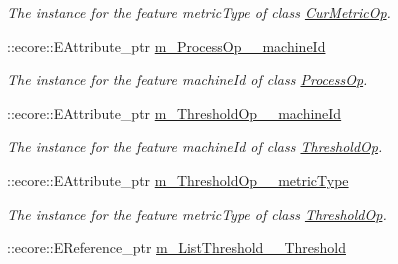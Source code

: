 \begin{DoxyCompactItemize}
\begin{DoxyCompactList}\small\item\em The instance for the feature metricType of class \hyperlink{classIMS__Data_1_1CurMetricOp}{CurMetricOp}. \item\end{DoxyCompactList}\item 
\hypertarget{classIMS__Data_1_1IMS__DataPackage_a6c70aefbee826b20356847d786c2ff93}{
::ecore::EAttribute\_\-ptr \hyperlink{classIMS__Data_1_1IMS__DataPackage_a6c70aefbee826b20356847d786c2ff93}{m\_\-ProcessOp\_\-\_\-machineId}}
\label{classIMS__Data_1_1IMS__DataPackage_a6c70aefbee826b20356847d786c2ff93}

\begin{DoxyCompactList}\small\item\em The instance for the feature machineId of class \hyperlink{classIMS__Data_1_1ProcessOp}{ProcessOp}. \item\end{DoxyCompactList}\item 
\hypertarget{classIMS__Data_1_1IMS__DataPackage_a8b64937de6982536668b46ae59641b3f}{
::ecore::EAttribute\_\-ptr \hyperlink{classIMS__Data_1_1IMS__DataPackage_a8b64937de6982536668b46ae59641b3f}{m\_\-ThresholdOp\_\-\_\-machineId}}
\label{classIMS__Data_1_1IMS__DataPackage_a8b64937de6982536668b46ae59641b3f}

\begin{DoxyCompactList}\small\item\em The instance for the feature machineId of class \hyperlink{classIMS__Data_1_1ThresholdOp}{ThresholdOp}. \item\end{DoxyCompactList}\item 
\hypertarget{classIMS__Data_1_1IMS__DataPackage_a1be5de85004e70ee0532a52e74ebdbb1}{
::ecore::EAttribute\_\-ptr \hyperlink{classIMS__Data_1_1IMS__DataPackage_a1be5de85004e70ee0532a52e74ebdbb1}{m\_\-ThresholdOp\_\-\_\-metricType}}
\label{classIMS__Data_1_1IMS__DataPackage_a1be5de85004e70ee0532a52e74ebdbb1}

\begin{DoxyCompactList}\small\item\em The instance for the feature metricType of class \hyperlink{classIMS__Data_1_1ThresholdOp}{ThresholdOp}. \item\end{DoxyCompactList}\item 
\hypertarget{classIMS__Data_1_1IMS__DataPackage_a8f95b42b042c75bc13f94ed99552f186}{
::ecore::EReference\_\-ptr \hyperlink{classIMS__Data_1_1IMS__DataPackage_a8f95b42b042c75bc13f94ed99552f186}{m\_\-ListThreshold\_\-\_\-Threshold}}
\label{classIMS__Data_1_1IMS__DataPackage_a8f95b42b042c75bc13f94ed99552f186}


\end{DoxyCompactItemize}
